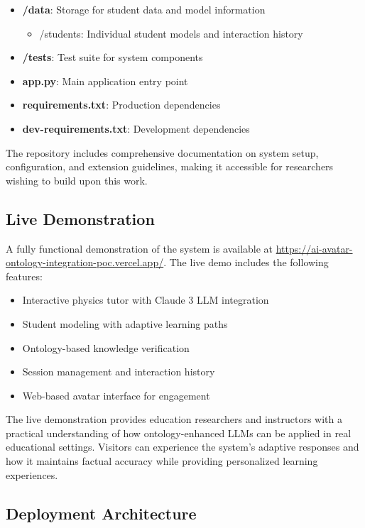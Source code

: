 \begin{itemize}
  \item \textbf{/data}: Storage for student data and model information
    \begin{itemize}
      \item /students: Individual student models and interaction history
    \end{itemize}
  
  \item \textbf{/tests}: Test suite for system components
  
  \item \textbf{app.py}: Main application entry point
  \item \textbf{requirements.txt}: Production dependencies
  \item \textbf{dev-requirements.txt}: Development dependencies
\end{itemize}

The repository includes comprehensive documentation on system setup, configuration, and extension guidelines, making it accessible for researchers wishing to build upon this work.

\subsection{Live Demonstration}
\label{subsec:live-demo}

A fully functional demonstration of the system is available at \url{https://ai-avatar-ontology-integration-poc.vercel.app/}. The live demo includes the following features:

\begin{itemize}
  \item Interactive physics tutor with Claude 3 LLM integration
  \item Student modeling with adaptive learning paths
  \item Ontology-based knowledge verification
  \item Session management and interaction history
  \item Web-based avatar interface for engagement
\end{itemize}

The live demonstration provides education researchers and instructors with a practical understanding of how ontology-enhanced LLMs can be applied in real educational settings. Visitors can experience the system's adaptive responses and how it maintains factual accuracy while providing personalized learning experiences.

\subsection{Deployment Architecture}
\label{subsec:deployment-arch}

